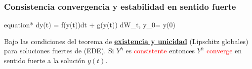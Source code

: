 \begin{frame}
	\frametitle{Consistencia convergencia y estabilidad en sentido fuerte}	
	\hypertarget{thm:ConsistenciaConvergencia}{}	
	\begin{empheq}[box={\Garybox[EDE]}]{equation*}
		dy(t) = f(y(t))dt + g(y(t)) dW_t, \qquad y_0= y(0) 
	\end{empheq}
	\begin{overlayarea}{\textwidth}{\textheight}
 	 \begin{Teorema}
		Bajo las condiciones del teorema de
		\hyperlink{thm:ExistenciaUnicidadEDE}{ \textbf{existencia y unicidad}} (Lipschitz globales)
		para soluciones fuertes de (EDE). Si $Y^{h}$ es \textcolor{red}{consistente} entonces
		$Y^{h}$ \textcolor{red}{converge} en sentido fuerte a la solución $y(t)$.
  \end{Teorema}
	\end{overlayarea}
\end{frame}
